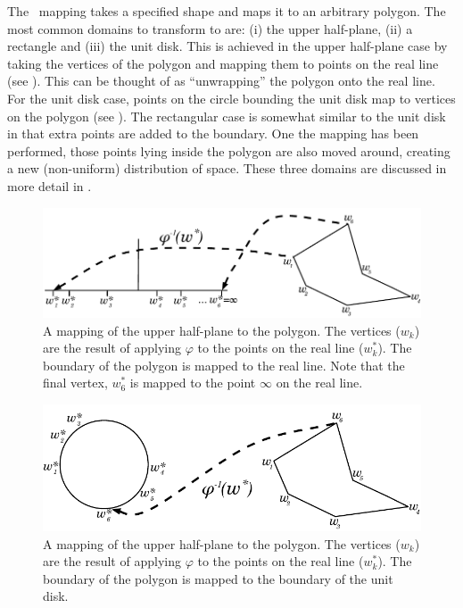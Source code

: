 The \sch\ mapping takes a specified shape and maps it to an arbitrary polygon. The most common domains to transform to are: (i) the upper half-plane, (ii) a rectangle and (iii) the unit disk. This is achieved in the upper half-plane case by taking the vertices of the polygon and mapping them to points on the real line (see ). This can be thought of as ``unwrapping'' the polygon onto the real line. For the unit disk case, points on the circle bounding the unit disk map to vertices on the polygon (see ). The rectangular case is somewhat similar to the unit disk in that extra points are added to the boundary. One the mapping has been performed, those points lying inside the polygon are also moved around, creating a new (non-uniform) distribution of space. These three domains are discussed in more detail in .

\begin{figure} [t]
\centering
\includegraphics[scale=0.6]{sc/figs/reallinedia.pdf}
\caption{A mapping of the upper half-plane to the polygon. The vertices ($w_k$) are the result of applying $\varphi$ to the points on the real line ($w^*_k$). The boundary of the polygon is mapped to the real line. Note that the final vertex, $w^*_6$ is mapped to the point $\infty$ on the real line.}
\label{reallinedia}
\end{figure}

\begin{figure} [t]
\centering
\includegraphics[scale=0.6]{sc/figs/unitdiskdia.pdf}
\caption{A mapping of the upper half-plane to the polygon. The vertices ($w_k$) are the result of applying $\varphi$ to the points on the real line ($w^*_k$). The boundary of the polygon is mapped to the boundary of the unit disk.}
\label{unitdiskdia}
\end{figure}

